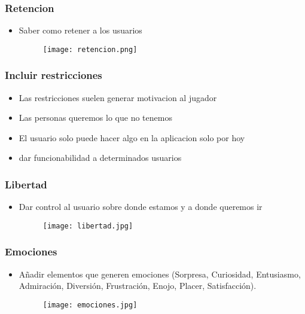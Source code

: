 \documentclass[11pt]{beamer}
\begin{document}
\begin{frame}
\frametitle{Retencion}
\begin{itemize}
    \item Saber como retener a los usuarios
     \begin{figure}
        \texttt{[image: retencion.png]}
        \label{fig:my_label}
    \end{figure}
\end{itemize}
\end{frame}



\begin{frame}
\frametitle{Incluir restricciones}
\begin{itemize}
    \item Las restricciones suelen generar motivacion al jugador 
    \item Las personas queremos lo que no tenemos 
    \item El usuario solo puede hacer algo en la aplicacion solo por hoy
    \item dar funcionabilidad a determinados usuarios
\end{itemize}
\end{frame}



\begin{frame}
\frametitle{Libertad}
\begin{itemize}
    \item Dar control al usuario sobre donde estamos y a donde queremos ir 
    \begin{figure}
        \texttt{[image: libertad.jpg]}
        \label{fig:my_label}
    \end{figure}
\end{itemize}
\end{frame}



\begin{frame}
\frametitle{Emociones}
\begin{itemize}
    \item Añadir elementos que generen emociones (Sorpresa, Curiosidad, Entusiasmo, Admiración, Diversión, Frustración, Enojo, Placer, Satisfacción).
    \begin{figure}
        \texttt{[image: emociones.jpg]}
        \label{fig:my_label}
    \end{figure}
    
\end{itemize}
\end{frame} 
\end{document}
